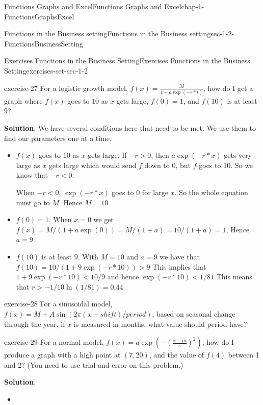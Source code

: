 \documentclass[oneside,10pt,]{book}
\numberwithin{equation}{section}
\newcommand{\lt}{<}
\newcommand{\gt}{>}
\begin{document}
\begin{chapterptx}{Functions Graphs and Excel}{}{Functions Graphs and Excel}{}{}{chap-1-FunctionsGraphsExcel}
\begin{sectionptx}{Functions in the Business setting}{}{Functions in the Business setting}{}{}{sec-1-2-FunctionsBusinessSetting}
\begin{exercises-subsection-numberless}{Exercises  Functions in the Business Setting}{}{Exercises  Functions in the Business Setting}{}{}{exercises-set-sec-1-2}
\begin{divisionexercise}{7}{}{}{exercise-27}%
\hypertarget{p-187}{}%
For a logistic growth model, \(f(x)=\frac{M}{1+a \exp(-r*t)}\), how do I get a graph where \(f(x)\) goes to \(10\) as \(x\) gets large, \(f(0)=1\), and \(f(10)\) is at least \(9\)?%
\par\smallskip%
\noindent\textbf{Solution}.\hypertarget{solution-14}{}\quad%
\hypertarget{p-188}{}%
We have several conditions here that need to be met. We use them to find our parameters one at a time.%
\leavevmode%
\begin{itemize}[label=\textbullet]
\item{}\hypertarget{p-189}{}%
\(f(x)\) goes to \(10\) as \(x\) gets large. If  \(-r\gt 0\), then \(a\exp(-r*x)\) gets very large as \(x\) gets large which would send \(f\) down to \(0\), but \(f\) goes to \(10.\) So we know that \(-r\lt 0\).%
\par
\hypertarget{p-190}{}%
When \(-r\lt 0\), \(\exp(-r*x)\) goes to \(0\) for large \(x\). So the whole equation must go to \(M\). Hence \(M=10\)%
\item{}\hypertarget{p-191}{}%
\(f(0)=1\). When \(x = 0\) we get \(f(x)=M/(1+a \exp(0) )=M/(1+a)=10/(1+a)=1\), Hence \(a = 9\)%
\item{}\hypertarget{p-192}{}%
\(f(10)\) is at least \(9\). With \(M = 10\) and  \(a = 9\) we have that \(f(10)=10/(1+9 \exp(-r*10) )\gt 9\) This implies that \(1+9 \exp(-r*10)\lt 10/9\) and hence \(\exp(-r*10)\lt 1/81\) This means that  \(r\gt -1/10  \ln(1/81)= 0.44\)%
\end{itemize}
\end{divisionexercise}%
\begin{divisionexercise}{8}{}{}{exercise-28}%
\hypertarget{p-193}{}%
For a sinusoidal model, \(f(x)=M+A \sin(2\pi(x+shift)/period)\), based on seasonal change through the year, if \(x\) is measured in months, what value should period have?%
\end{divisionexercise}%
\begin{divisionexercise}{9}{}{}{exercise-29}%
\hypertarget{p-194}{}%
For a normal model, \(f(x)=a \exp\left(-\left(\frac{x-m}{s}\right)^2\right)\), how do I produce a graph with a high point at \((7, 20)\), and the value of \(f(4)\) between 1 and 2?  (You need to use trial and error on this problem.)%
\par\smallskip%
\noindent\textbf{Solution}.\hypertarget{solution-15}{}\quad%
\leavevmode%
\begin{itemize}[label=\textbullet]
\item{}\hypertarget{p-195}{}%

\end{itemize}
\end{divisionexercise}
\end{exercises-subsection-numberless}
\end{sectionptx}
\end{chapterptx}
\end{document}
